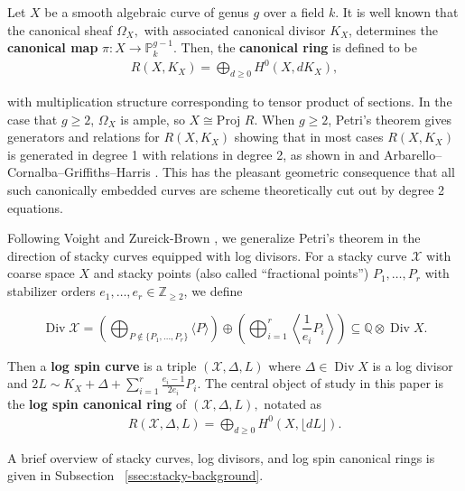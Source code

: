 \documentclass{amsart}
\theoremstyle{plain}
\theoremstyle{definition}
\theoremstyle{remark}
\numberwithin{equation}{section}
\newcommand\BQ{{\mathbb Q}}
\newcommand\BP{{\mathbb P}}
\newcommand\BZ{{\mathbb Z}}
\newcommand\proj{\text{Proj }}
\DeclareMathOperator\di{Div}
\newcommand\sx{\mathscr X}
\newcommand \subhalf[1]{\frac{{#1} - 1}{2{#1}}}
\newcommand{\halfcan}{L}
\begin{document}
Let $X$ be a smooth algebraic curve of genus $g$ over a field $k$.
It is well known that the canonical sheaf $\Omega _X,$ with
associated canonical divisor $K_X$, determines the {\bf canonical
map } $\pi: X \rightarrow \BP_k^{g - 1}$. Then, the {\bf canonical
ring} is defined to be
\begin{align*}
	R(X, K_X) = \bigoplus_{d \geq 0} H^0(X, dK_X),
\end{align*}

\noindent
with multiplication structure corresponding to tensor product of
sections. In the case that $g \geq 2$, $\Omega_X$ is ample, so $X
\cong \proj R$. When $g \geq 2$, Petri's theorem gives generators
and relations for $R(X, K_X)$ showing that in most cases $R(X, K_X)$
is generated in degree 1 with relations in degree 2, as shown in
\cite[p. 157]{saint-donat:proj} and Arbarello--Cornalba--Griffiths--Harris
\cite[Section 3.3]{acgh:algebraic-curves}. This has the pleasant 
geometric consequence that all such canonically embedded curves are
scheme theoretically cut out by degree 2 equations.

Following Voight and Zureick-Brown \cite{vzb:stacky}, we generalize 
Petri's theorem in the direction of stacky curves equipped with
log divisors. For a stacky curve $\sx$ with coarse space $X$ and
stacky points (also called ``fractional points'') $P_1, \ldots, P_r$
with stabilizer orders $e_1, \ldots, e_r \in \BZ_{\geq 2}$, we define

\[
	\di \sx = \left(\bigoplus_{P\notin \{P_1, \ldots, P_r\}} \langle 
	P \rangle \right) \oplus \left(\bigoplus_{i = 1}^r \left \langle 
	\frac{1}{e_i}P_i \right \rangle \right) \subseteq \BQ \otimes \di X.
\]

Then a {\bf log spin curve} is a triple $(\sx, \Delta, \halfcan)$
where $\Delta \in \di X$ is a log divisor and $2\halfcan \sim K_X +
\Delta + \sum_{i = 1}^{r} \subhalf{e_i} P_i$. The central object of
study in this paper is the {\bf log spin canonical ring} of $(\sx,
\Delta, \halfcan),$ notated as
\begin{align*}
	R(\sx, \Delta, \halfcan) = \bigoplus_{d \geq 0} H^0(X, \lfloor d \halfcan \rfloor).
\end{align*}

\noindent
A brief overview of stacky curves, log divisors, and log spin
canonical rings is given in Subsection
~\ref{ssec:stacky-background}.

\end{document}
